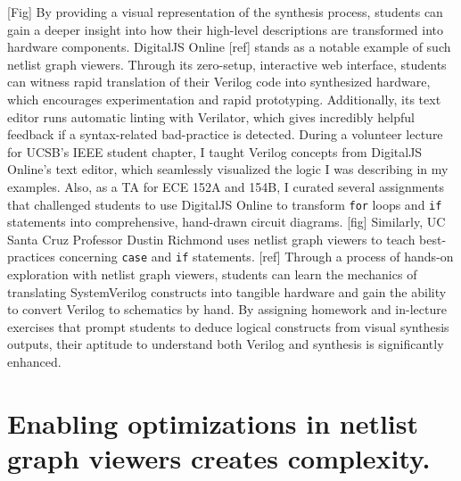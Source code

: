 [Fig] By providing a visual representation of the synthesis process, students can gain a deeper insight into how their high-level descriptions are transformed into hardware components. DigitalJS Online [ref] stands as a notable example of such netlist graph viewers. Through its zero-setup, interactive web interface, students can witness rapid translation of their Verilog code into synthesized hardware, which encourages experimentation and rapid prototyping. Additionally, its text editor runs automatic linting with Verilator, which gives incredibly helpful feedback if a syntax-related bad-practice is detected. During a volunteer lecture for UCSB's IEEE student chapter, I taught Verilog concepts from DigitalJS Online's text editor, which seamlessly visualized the logic I was describing in my examples. Also, as a TA for ECE 152A and 154B, I curated several assignments that challenged students to use DigitalJS Online to transform \texttt{for} loops and \texttt{if} statements into comprehensive, hand-drawn circuit diagrams. [fig] Similarly, UC Santa Cruz Professor Dustin Richmond uses netlist graph viewers to teach best-practices concerning \texttt{case} and \texttt{if} statements. [ref] Through a process of hands-on exploration with netlist graph viewers, students can learn the mechanics of translating SystemVerilog constructs into tangible hardware and gain the ability to convert Verilog to schematics by hand. By assigning homework and in-lecture exercises that prompt students to deduce logical constructs from visual synthesis outputs, their aptitude to understand both Verilog and synthesis is significantly enhanced.

\section{Enabling optimizations in netlist graph viewers creates complexity.}

